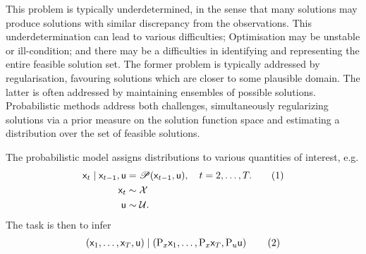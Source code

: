 \documentclass{article}
\newcommand\numberthis{\addtocounter{equation}{1}\tag{\theequation}}
\newcommand{\mm}[1]{\mathrm{#1}}
\newcommand{\rv}[1]{\mathsf{#1}}
\newcommand{\dist}[1]{\mathcal{#1}}
\newcommand{\op}[1]{\mathscr{#1}}
\newcommand{\seenstate}[1]{\mm{P}_{x}{#1}}
\newcommand{\seeninp}[1]{\mm{P}_{u}{#1}}
\newcommand{\gvn}{\mid}
\newcommand{\inp}{\rv{u}}
\newcommand{\state}{\rv{x}}
\begin{document}
This problem is typically underdetermined, in the sense that many solutions may produce solutions with similar discrepancy from the observations.
This underdetermination can lead to various difficulties;
Optimisation may be unstable or ill-condition; and there may be a difficulties in identifying and representing the entire feasible solution set.
The former problem is typically addressed by regularisation, favouring solutions which are closer to some plausible domain.
The latter is often addressed by maintaining ensembles of possible solutions.
Probabilistic methods address both challenges, simultaneously regularizing solutions via a prior measure on the solution function space and estimating a distribution over the set of feasible solutions. 
\begin{comment} 
Dan: You may be interested to have a look at Tikhonov (and singular value decomposition) regularisation method as described in the PEST book (I will send you on teams). These are quite popular in the groundwater model calibration and uncertainty analysis world. 
\end{comment}
The probabilistic model assigns distributions to various quantities of interest, e.g.
\begin{align*}
\state_{t} \gvn \state_{t-1},\inp 
&= \op{P}(\state_{t-1},\inp ), \quad t=2,\dots,T.
\numberthis \label{eq:proc_proj_sem} \\
\state_{t}
&\sim \dist{X}\\
\inp & \sim \dist{U}.
\end{align*}
The task is then to infer
\begin{align*}
\left(\state_{1},\dots, \state_{T},\inp \right)\gvn
\left(\seenstate{\state}_{1},\dots, \seenstate{\state}_{T},\seeninp{\inp}\right)
\numberthis \label{eq:proc_proj_sem_inv}
\end{align*}
\end{document}
